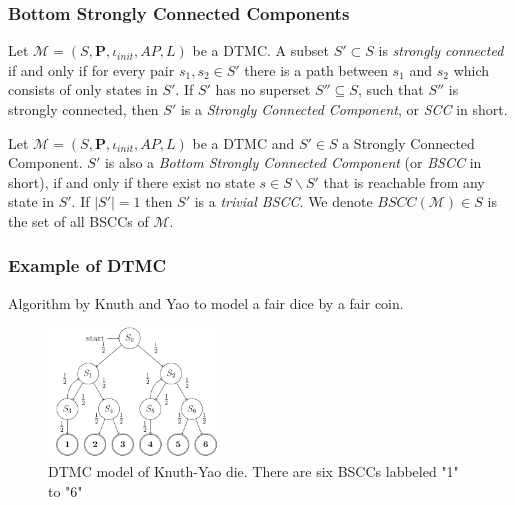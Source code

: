 \documentclass{beamer}
\begin{document}
\begin{frame}
    \frametitle{Bottom Strongly Connected Components}
    \footnotesize{
        \begin{definition}
            \rm
            Let $\mathcal{M}=(S,\mathbf{P}, \iota_{init}, AP,L)$ be a DTMC. A subset $S'\subset S$ is
            \textit{strongly connected} if and only if for every pair $s_1,s_2\in S'$ there is a path
            between $s_1$ and $s_2$ which consists of only states in $S'$. If $S'$ has no superset
            $S''\subseteq S$, such that $S''$ is strongly connected, then $S'$ is a \textit{Strongly
                Connected Component}, or \textit{SCC} in short.
        \end{definition}

        \begin{definition}
            \rm
            Let $\mathcal{M}=(S,\mathbf{P}, \iota_{init}, AP,L)$ be a DTMC and $S'\in S$ a Strongly
            Connected Component. $S'$ is also a \textit{Bottom Strongly Connected Component} (or
            \textit{BSCC} in short), if and only if there exist no state $s \in S\backslash S'$ that is reachable
            from any state in $S'$. If $|S'|=1$ then $S'$ is a \textit{trivial BSCC}. We denote
            $BSCC(\mathcal{M})\in S$ is the set of all BSCCs of $\mathcal{M}$.
        \end{definition}
    }
\end{frame}

\begin{frame}
    \frametitle{Example of DTMC}
    Algorithm by Knuth and Yao \cite{knuth1976complexity} to model a fair dice by a fair coin.
    \begin{figure}[H]
        \centering
        \includegraphics[width=0.4\textwidth]{figures/knuth_die_dtmc.png}
        \caption{DTMC model of Knuth-Yao die. There are six BSCCs labbeled "1" to "6"}
        \label{fig:knuth-die-dtmc}
    \end{figure}
\end{frame}
\end{document}
